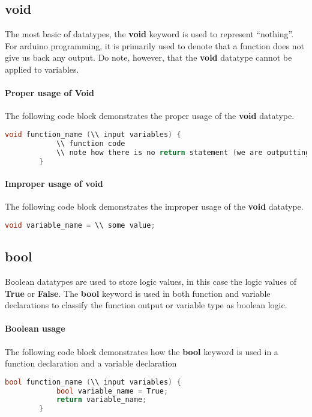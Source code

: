     \subsection{void}
    The most basic of datatypes, the \textbf{void} keyword is used to represent \enquote{nothing}. For arduino programming, it is primarily used to denote that a function
    does not give us back any output. Do note, however, that the \textbf{void} datatype cannot be applied to variables.
    
    \paragraph*{Proper usage of Void} The following code block demonstrates the proper usage of the \textbf{void} datatype.
    \begin{lstlisting}[linewidth=1.5\textwidth, language=C++]
        void function_name (\\ input variables) {
            \\ function code
            \\ note how there is no return statement (we are outputting nothing)
        }\end{lstlisting}

    \paragraph*{Improper usage of void} The following code block demonstrates the improper usage of the \textbf{void} datatype.
    \begin{lstlisting}[linewidth=1.5\textwidth, language=C++]
        void variable_name = \\ some value;\end{lstlisting}
    
    \subsection{bool}
    Boolean datatypes are used to store logic values, in this case the logic values of \textbf{True} or \textbf{False}. The \textbf{bool} keyword is used in both function and
    variable declarations to classify the function output or variable type as boolean logic.

    \paragraph*{Boolean usage} The following code block demonstrates how the \textbf{bool} keyword is used in a function declaration and a variable declaration
    \begin{lstlisting}[linewidth=1.5\textwidth, language=C++]
        bool function_name (\\ input variables) {
            bool variable_name = True;
            return variable_name;
        }\end{lstlisting}

